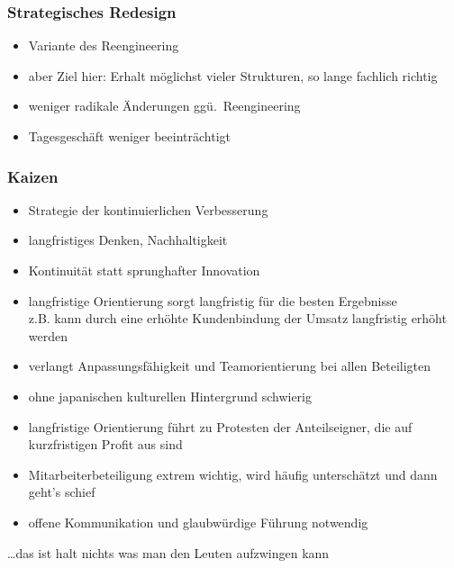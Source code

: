 \documentclass[a4paper, 12pt]{article}
\begin{document}
\subsubsection*{Strategisches Redesign}
\begin{itemize}
  \item Variante des Reengineering
  \item aber Ziel hier: Erhalt möglichst vieler Strukturen, so lange fachlich richtig
\end{itemize}
\begin{itemize}
  \renewcommand{\labelitemi}{+}%
  \item weniger radikale Änderungen ggü.\ Reengineering
  \item Tagesgeschäft weniger beeinträchtigt
\end{itemize}

\subsubsection*{Kaizen}
\begin{itemize}
  \item Strategie der kontinuierlichen Verbesserung
  \item langfristiges Denken, Nachhaltigkeit
  \item Kontinuität statt sprunghafter Innovation
\end{itemize}
\begin{itemize}
  \renewcommand{\labelitemi}{+}%
  \item langfristige Orientierung sorgt langfristig für die besten Ergebnisse\\
    z.B. kann durch eine erhöhte Kundenbindung der Umsatz langfristig erhöht werden
\end{itemize}
\begin{itemize}
  \renewcommand{\labelitemi}{\(-\)}%
  \item verlangt Anpassungsfähigkeit und Teamorientierung bei allen Beteiligten
  \item ohne japanischen kulturellen Hintergrund schwierig
  \item langfristige Orientierung führt zu Protesten der Anteilseigner, die auf kurzfristigen Profit aus sind
  \item Mitarbeiterbeteiligung extrem wichtig, wird häufig unterschätzt und dann geht's schief
  \item offene Kommunikation und glaubwürdige Führung notwendig
\end{itemize}
\ldots das ist halt nichts was man den Leuten aufzwingen kann
\end{document}
